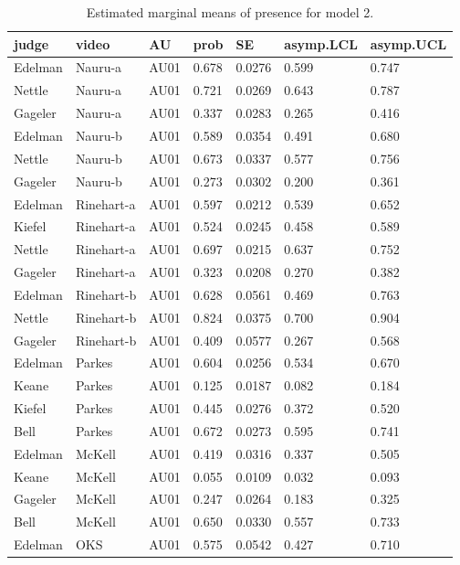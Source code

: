 \documentclass{monashthesis}
\begin{document}
\begin{center}
\begin{longtable}{lllllll}
\caption{\label{tab:result-2}Estimated marginal means of presence for model 2. }\\
\toprule
judge & video & AU & prob & SE & asymp.LCL & asymp.UCL \\
\midrule
\endhead
\bottomrule
\endfoot
Edelman & Nauru-a & AU01 & 0.678 & 0.0276 & 0.599 & 0.747 \\
Nettle & Nauru-a & AU01 & 0.721 & 0.0269 & 0.643 & 0.787 \\
Gageler & Nauru-a & AU01 & 0.337 & 0.0283 & 0.265 & 0.416 \\
Edelman & Nauru-b & AU01 & 0.589 & 0.0354 & 0.491 & 0.680 \\
Nettle & Nauru-b & AU01 & 0.673 & 0.0337 & 0.577 & 0.756 \\
Gageler & Nauru-b & AU01 & 0.273 & 0.0302 & 0.200 & 0.361 \\
Edelman & Rinehart-a & AU01 & 0.597 & 0.0212 & 0.539 & 0.652 \\
Kiefel & Rinehart-a & AU01 & 0.524 & 0.0245 & 0.458 & 0.589 \\
Nettle & Rinehart-a & AU01 & 0.697 & 0.0215 & 0.637 & 0.752 \\
Gageler & Rinehart-a & AU01 & 0.323 & 0.0208 & 0.270 & 0.382 \\
Edelman & Rinehart-b & AU01 & 0.628 & 0.0561 & 0.469 & 0.763 \\
Nettle & Rinehart-b & AU01 & 0.824 & 0.0375 & 0.700 & 0.904 \\
Gageler & Rinehart-b & AU01 & 0.409 & 0.0577 & 0.267 & 0.568 \\
Edelman & Parkes & AU01 & 0.604 & 0.0256 & 0.534 & 0.670 \\
Keane & Parkes & AU01 & 0.125 & 0.0187 & 0.082 & 0.184 \\
Kiefel & Parkes & AU01 & 0.445 & 0.0276 & 0.372 & 0.520 \\
Bell & Parkes & AU01 & 0.672 & 0.0273 & 0.595 & 0.741 \\
Edelman & McKell & AU01 & 0.419 & 0.0316 & 0.337 & 0.505 \\
Keane & McKell & AU01 & 0.055 & 0.0109 & 0.032 & 0.093 \\
Gageler & McKell & AU01 & 0.247 & 0.0264 & 0.183 & 0.325 \\
Bell & McKell & AU01 & 0.650 & 0.0330 & 0.557 & 0.733 \\
Edelman & OKS & AU01 & 0.575 & 0.0542 & 0.427 & 0.710 \\

\end{longtable}
\end{center}
\end{document}
